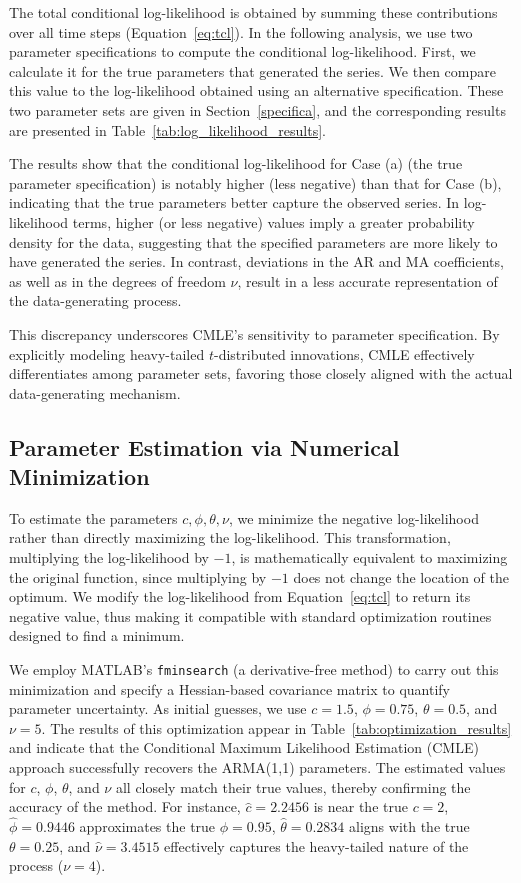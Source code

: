 \documentclass[a4paper,12pt]{article}
\begin{document}
The total conditional log-likelihood is obtained by summing these contributions over all time steps (Equation~\ref{eq:tcl}). In the following analysis, we use two parameter specifications to compute the conditional log-likelihood. First, we calculate it for the true parameters that generated the series. We then compare this value to the log-likelihood obtained using an alternative specification. These two parameter sets are given in Section~\ref{specifica}, and the corresponding results are presented in Table~\ref{tab:log_likelihood_results}.

The results show that the conditional log-likelihood for Case (a) (the true parameter specification) is notably higher (less negative) than that for Case (b), indicating that the true parameters better capture the observed series. In log-likelihood terms, higher (or less negative) values imply a greater probability density for the data, suggesting that the specified parameters are more likely to have generated the series. In contrast, deviations in the AR and MA coefficients, as well as in the degrees of freedom \(\nu\), result in a less accurate representation of the data-generating process.

This discrepancy underscores CMLE’s sensitivity to parameter specification. By explicitly modeling heavy-tailed \(t\)-distributed innovations, CMLE effectively differentiates among parameter sets, favoring those closely aligned with the actual data-generating mechanism.

\subsection{Parameter Estimation via Numerical Minimization}
To estimate the parameters \( c, \phi, \theta, \nu \), we minimize the negative log-likelihood rather than directly maximizing the log-likelihood. This transformation, multiplying the log-likelihood by \(-1\), is mathematically equivalent to maximizing the original function, since multiplying by \(-1\) does not change the location of the optimum. We modify the log-likelihood from Equation~\ref{eq:tcl} to return its negative value, thus making it compatible with standard optimization routines designed to find a minimum.

We employ MATLAB’s \texttt{fminsearch} (a derivative-free method) to carry out this minimization and specify a Hessian-based covariance matrix to quantify parameter uncertainty. As initial guesses, we use \(c = 1.5\), \(\phi = 0.75\), \(\theta = 0.5\), and \(\nu = 5\). The results of this optimization appear in Table~\ref{tab:optimization_results} and indicate that the Conditional Maximum Likelihood Estimation (CMLE) approach successfully recovers the ARMA(1,1) parameters. The estimated values for \(c\), \(\phi\), \(\theta\), and \(\nu\) all closely match their true values, thereby confirming the accuracy of the method. For instance, \(\hat{c} = 2.2456\) is near the true \(c = 2\), \(\hat{\phi} = 0.9446\) approximates the true \(\phi = 0.95\), \(\hat{\theta} = 0.2834\) aligns with the true \(\theta = 0.25\), and \(\hat{\nu} = 3.4515\) effectively captures the heavy-tailed nature of the process (\(\nu = 4\)).
\end{document}
